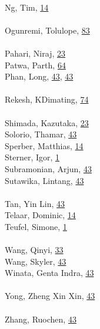 \documentclass[11pt,oneside]{book}
\begin{document}
\begin{multicols}{2}
\\ %
Ng, Tim, \hyperlink{page.14}{14}\\
\\ %
Ogunremi, Tolulope, \hyperlink{page.83}{83}\\
\\ %
Pahari, Niraj, \hyperlink{page.23}{23}\\
Patwa, Parth, \hyperlink{page.64}{64}\\
Phan, Long, \hyperlink{page.43}{43}, \hyperlink{page.43}{43}\\
\\ %
Rekesh, KDimating, \hyperlink{page.74}{74}\\
\\ %
Shimada, Kazutaka, \hyperlink{page.23}{23}\\
Solorio, Thamar, \hyperlink{page.43}{43}\\
Sperber, Matthias, \hyperlink{page.14}{14}\\
Sterner, Igor, \hyperlink{page.1}{1}\\
Subramonian, Arjun, \hyperlink{page.43}{43}\\
Sutawika, Lintang, \hyperlink{page.43}{43}\\
\\ %
Tan, Yin Lin, \hyperlink{page.43}{43}\\
Telaar, Dominic, \hyperlink{page.14}{14}\\
Teufel, Simone, \hyperlink{page.1}{1}\\
\\ %
Wang, Qinyi, \hyperlink{page.33}{33}\\
Wang, Skyler, \hyperlink{page.43}{43}\\
Winata, Genta Indra, \hyperlink{page.43}{43}\\
\\ %
Yong, Zheng Xin Xin, \hyperlink{page.43}{43}\\
\\ %
Zhang, Ruochen, \hyperlink{page.43}{43}\\
\\ %
\end{multicols}
\end{document}
